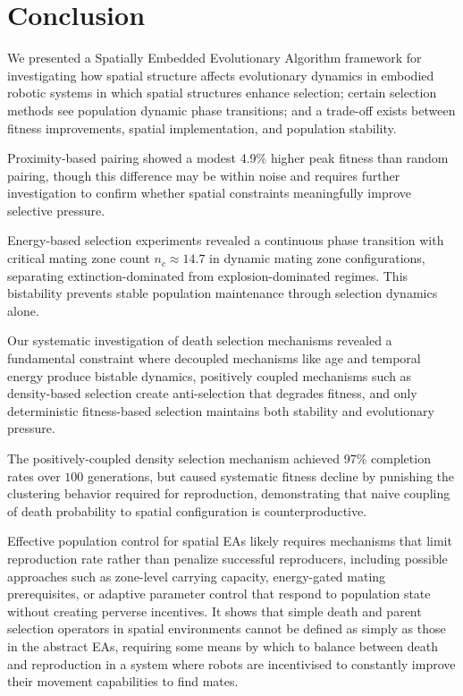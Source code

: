 \documentclass[dvipsnames,format=sigconf,anonymous=false,review=false]{acmart}
\begin{document}
\section{Conclusion}

We presented a Spatially Embedded Evolutionary Algorithm framework for investigating how spatial structure affects evolutionary dynamics in embodied robotic systems in which spatial structures enhance selection; certain selection methods see population dynamic phase transitions; and a trade-off exists between fitness improvements, spatial implementation, and population stability.

Proximity-based pairing showed a modest 4.9\% higher peak fitness than random pairing, though this difference may be within noise and requires further investigation to confirm whether spatial constraints meaningfully improve selective pressure.

Energy-based selection experiments revealed a continuous phase transition with critical mating zone count $n_c \approx 14.7$ in dynamic mating zone configurations, separating extinction-dominated from explosion-dominated regimes. This bistability prevents stable population maintenance through selection dynamics alone.

Our systematic investigation of death selection mechanisms revealed a fundamental constraint where decoupled mechanisms like age and temporal energy produce bistable dynamics, positively coupled mechanisms such as density-based selection create anti-selection that degrades fitness, and only deterministic fitness-based selection maintains both stability and evolutionary pressure.

The positively-coupled density selection mechanism achieved 97\% completion rates over $100$ generations, but caused systematic fitness decline by punishing the clustering behavior required for reproduction, demonstrating that naive coupling of death probability to spatial configuration is counterproductive.

Effective population control for spatial EAs likely requires mechanisms that limit reproduction rate rather than penalize successful reproducers, including possible approaches such as zone-level carrying capacity, energy-gated mating prerequisites, or adaptive parameter control that respond to population state without creating perverse incentives. It shows that simple death and parent selection operators in spatial environments cannot be defined as simply as those in the abstract EAs, requiring some means by which to balance between death and reproduction in a system where robots are incentivised to constantly improve their movement capabilities to find mates.
\end{document}
